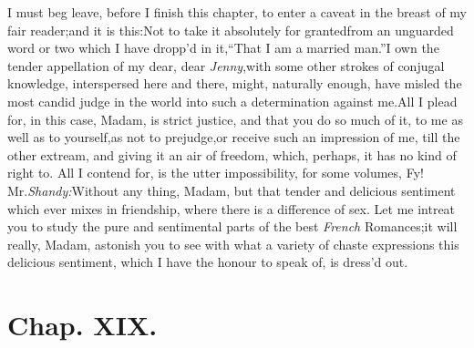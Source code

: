 \documentclass{article}
\begin{document}
I must beg leave, before I finish this chapter, to enter a
caveat in the breast of my fair reader;\tsk  and it is
this:\tsh\break  Not to take it absolutely for granted\break from an
unguarded word or two which I have dropp’d in
it,\tsh  “That I am a married
man.”\tsk  I own the tender appel\-lation of my dear, dear
\textit{Jenny},\tsk  with some other strokes of conjugal know\-ledge,
interspersed here and there, might, naturally enough, have misled
the most candid judge in the world into such a determination
against me.\tsk  All I plead for, in this case, Madam, is strict
justice, and that you do so much of it, to me as well as to
yourself,\tsk  as not to prejudge,\break or receive such an impression
of me, till\pb 
{}
the other
extream, and giving it an air of freedom, which, perhaps, it has no
kind of right to. All I contend for, is the utter impossibility,
for some volumes, 
\pb 
{}
Fy! Mr.\@ \textit{Shandy:}\tsk  Without
any thing, Madam, but that tender and delicious sentiment which
ever mixes in friendship, where there is a difference of sex. Let
me intreat you to study the pure and sentimental parts of the best
\textit{French} Romances;\tsk  it will really, Madam, astonish you
to see with what a variety of chaste expressions this delicious
sentiment, which I have the honour to speak of, is dress’d
out.

\section{Chap. XIX.}
\end{document}
